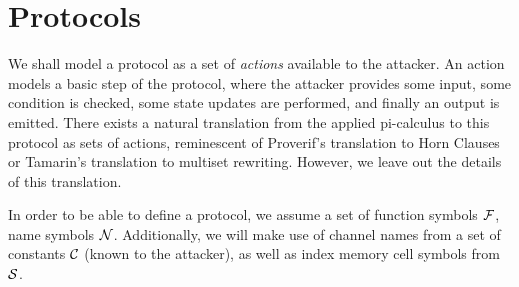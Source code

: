 \section{Protocols}

We shall model a protocol as a set of \emph{actions} available to the
attacker. An action models a basic step of the protocol, where
the attacker provides some input, some condition is checked, some
state updates are performed, and finally an output is emitted.
There exists a natural translation from the applied pi-calculus to this
protocol as sets of actions, reminescent of Proverif's translation to Horn
Clauses or Tamarin's translation to multiset rewriting. However, we leave out
the details of this translation.

In order to be able to define a protocol, we assume a set of function
symbols $\mathcal{F}$, name symbols $\mathcal{N}$.
Additionally, we will make use of channel names from a set of constants $\mathcal{C}$ (known to the attacker),
as well as index memory cell symbols from $\mathcal{S}$.

